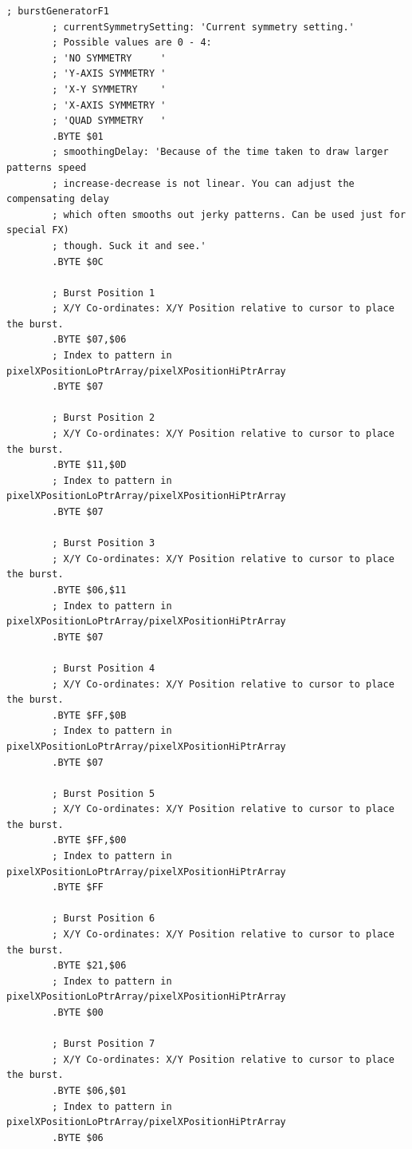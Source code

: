 \begin{lstlisting}[basicstyle=\tiny,caption=Source code for the F1 Burst.]
; burstGeneratorF1
        ; currentSymmetrySetting: 'Current symmetry setting.'
        ; Possible values are 0 - 4:
        ; 'NO SYMMETRY     '
        ; 'Y-AXIS SYMMETRY '
        ; 'X-Y SYMMETRY    '
        ; 'X-AXIS SYMMETRY '
        ; 'QUAD SYMMETRY   '
        .BYTE $01
        ; smoothingDelay: 'Because of the time taken to draw larger patterns speed
        ; increase-decrease is not linear. You can adjust the compensating delay
        ; which often smooths out jerky patterns. Can be used just for special FX)
        ; though. Suck it and see.'
        .BYTE $0C

        ; Burst Position 1
        ; X/Y Co-ordinates: X/Y Position relative to cursor to place the burst.
        .BYTE $07,$06
        ; Index to pattern in pixelXPositionLoPtrArray/pixelXPositionHiPtrArray
        .BYTE $07

        ; Burst Position 2
        ; X/Y Co-ordinates: X/Y Position relative to cursor to place the burst.
        .BYTE $11,$0D
        ; Index to pattern in pixelXPositionLoPtrArray/pixelXPositionHiPtrArray
        .BYTE $07

        ; Burst Position 3
        ; X/Y Co-ordinates: X/Y Position relative to cursor to place the burst.
        .BYTE $06,$11
        ; Index to pattern in pixelXPositionLoPtrArray/pixelXPositionHiPtrArray
        .BYTE $07

        ; Burst Position 4
        ; X/Y Co-ordinates: X/Y Position relative to cursor to place the burst.
        .BYTE $FF,$0B
        ; Index to pattern in pixelXPositionLoPtrArray/pixelXPositionHiPtrArray
        .BYTE $07

        ; Burst Position 5
        ; X/Y Co-ordinates: X/Y Position relative to cursor to place the burst.
        .BYTE $FF,$00
        ; Index to pattern in pixelXPositionLoPtrArray/pixelXPositionHiPtrArray
        .BYTE $FF

        ; Burst Position 6
        ; X/Y Co-ordinates: X/Y Position relative to cursor to place the burst.
        .BYTE $21,$06
        ; Index to pattern in pixelXPositionLoPtrArray/pixelXPositionHiPtrArray
        .BYTE $00

        ; Burst Position 7
        ; X/Y Co-ordinates: X/Y Position relative to cursor to place the burst.
        .BYTE $06,$01
        ; Index to pattern in pixelXPositionLoPtrArray/pixelXPositionHiPtrArray
        .BYTE $06


\end{lstlisting}
